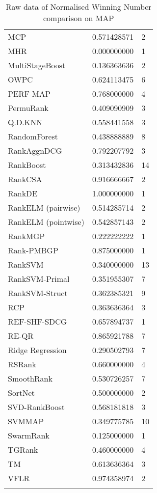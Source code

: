 \begin{longtable}{l|l|l}
MCP & 0.571428571 & 2 \\ 
MHR & 0.000000000 & 1 \\ 
MultiStageBoost & 0.136363636 & 2 \\ 
OWPC & 0.624113475 & 6 \\ 
PERF-\acs{MAP} & 0.768000000 & 4 \\ 
PermuRank & 0.409090909 & 3 \\ 
Q.D.\acs{KNN} & 0.558441558 & 3 \\ 
RandomForest & 0.438888889 & 8 \\ 
RankAgg\acs{nDCG} & 0.792207792 & 3 \\ 
RankBoost & 0.313432836 & 14 \\ 
RankCSA & 0.916666667 & 2 \\ 
RankDE & 1.000000000 & 1 \\ 
RankELM (pairwise) & 0.514285714 & 2 \\ 
RankELM (pointwise) & 0.542857143 & 2 \\ 
RankMGP & 0.222222222 & 1 \\ 
Rank-PMBGP & 0.875000000 & 1 \\ 
Rank\acs{SVM} & 0.340000000 & 13 \\ 
Rank\acs{SVM}-Primal & 0.351955307 & 7 \\ 
Rank\acs{SVM}-Struct & 0.362385321 & 9 \\ 
RCP & 0.363636364 & 3 \\ 
REF-SHF-SDCG & 0.657894737 & 1 \\ 
RE-QR & 0.865921788 & 7 \\ 
Ridge Regression & 0.290502793 & 7 \\ 
RSRank & 0.660000000 & 4 \\ 
SmoothRank & 0.530726257 & 7 \\ 
SortNet & 0.500000000 & 2 \\ 
\acs{SVD}-RankBoost & 0.568181818 & 3 \\ 
\acs{SVM}\acs{MAP} & 0.349775785 & 10 \\ 
SwarmRank & 0.125000000 & 1 \\ 
TGRank & 0.460000000 & 4 \\ 
TM & 0.613636364 & 3 \\ 
VFLR & 0.974358974 & 2 \\ 
\caption{Raw data of Normalised Winning Number comparison on \acs{MAP}}
\label{winnum_map}
\end{longtable}